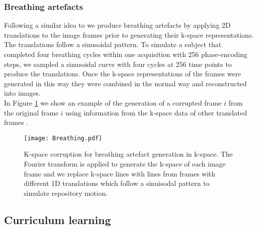 \documentclass[preprint,12pt,authoryear]{elsarticle}
\begin{document}
\subsubsection{Breathing artefacts}

Following a similar idea to \cite{Lorch2017} we produce breathing artefacts by applying 2D translations to the image frames prior to generating their k-space representations. The translations follow a sinusoidal pattern. To simulate a subject that completed four breathing cycles within one acquisition with 256 phase-encoding steps, we sampled a sinusoidal curve with four cycles at 256 time points to produce the translations.
Once the k-space representations of the frames were generated in this way they were combined in the normal way and reconstructed into images.\\

In Figure \ref{fig:Kspacebreathing} we show an example of the generation of a corrupted frame $i$ from the original frame $i$ using information from the k-space data of other translated frames \citep{Cruz2016}.


 \begin{figure}[tb]
  \centering
  \centerline{\texttt{[image: Breathing.pdf]}}
\caption{K-space corruption for breathing artefact generation in k-space. The Fourier transform is applied to generate the k-space of each image frame and we replace k-space lines with lines from frames with different 1D translations which follow a sinuisodal pattern to simulate repository motion. }
\label{fig:Kspacebreathing}
\end{figure}



\subsection{Curriculum learning}
\label{sec:curriculum}
\end{document}
